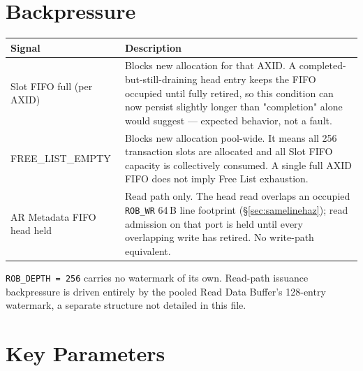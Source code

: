 \section{Backpressure}
\label{sec:backpressure}

\begin{center}
\begin{tabularx}{\textwidth}{>{\ttfamily}l X}
\toprule
\textbf{Signal} & \textbf{Description} \\
\midrule
Slot FIFO full (per AXID) & Blocks new allocation for that AXID. A completed-but-still-draining head entry keeps the FIFO occupied until fully retired, so this condition can now persist slightly longer than "completion" alone would suggest --- expected behavior, not a fault. \\
FREE\_LIST\_EMPTY         & Blocks new allocation pool-wide. It means all 256 transaction slots are allocated and all Slot FIFO capacity is collectively consumed. A single full AXID FIFO does not imply Free List exhaustion. \\
AR Metadata FIFO head held & Read path only. The head read overlaps an occupied \texttt{ROB\_WR} 64\,B line footprint (\S\ref{sec:samelinehaz}); read admission on that port is held until every overlapping write has retired. No write-path equivalent. \\
\bottomrule
\end{tabularx}
\end{center}

\medskip
\noindent \texttt{ROB\_DEPTH = 256} carries no watermark of its own. Read-path issuance backpressure is driven entirely by the pooled Read Data Buffer's 128-entry watermark, a separate structure not detailed in this file.

\section{Key Parameters}
\label{sec:params}

